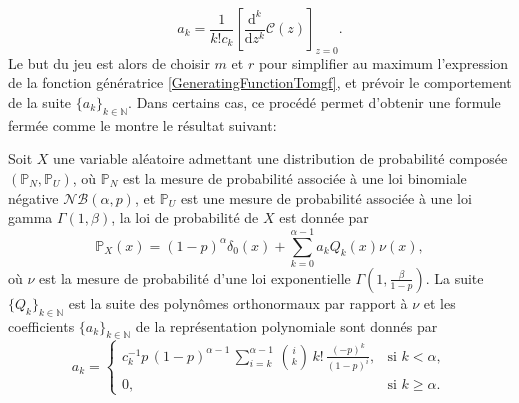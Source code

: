 \begin{equation}\label{CoefficientRepresentationGeneratingFunction}
a_{k}=\frac{1}{k!c_{k}}\left[\frac{\text{d}^{k}}{\text{d}z^{k}}\mathcal{C}(z)\right]_{z=0}.
\end{equation}
Le but du jeu est alors de choisir $m$ et $r$ pour simplifier au maximum l\rq{}expression de la fonction génératrice \eqref{GeneratingFunctionTomgf}, et prévoir le comportement de la suite $\{a_{k}\}_{k\in\mathbb{N}}$. Dans certains cas, ce procédé permet d\rq{}obtenir une formule fermée comme le montre le résultat suivant:
\begin{Prop}
Soit $X$ une variable aléatoire admettant une distribution de probabilité composée $(\mathbb{P}_{N},\mathbb{P}_{U})$, où $\mathbb{P}_{N}$ est la mesure de probabilité associée à une loi binomiale négative $\mathcal{NB}(\alpha,p)$, et $\mathbb{P}_{U}$ est une mesure de probabilité associée à une loi gamma $\Gamma(1,\beta)$, la loi de probabilité de $X$ est donnée par
\begin{equation*}\label{DensityNegativeBinomialCompoundExponential}
\mathbb{P}_{X}(x)=(1-p)^{\alpha}\delta_{0}(x)+\sum_{k=0}^{\alpha-1}a_{k}Q_{k}(x)\nu(x),
\end{equation*}
où $\nu$ est la mesure de probabilité d\rq{}une loi exponentielle $\Gamma\left(1,\frac{\beta}{1-p}\right)$. La suite $\{Q_{k}\}_{k\in\mathbb{N}}$ est la suite des polynômes orthonormaux par rapport à $\nu$ et les coefficients $\{a_{k}\}_{k\in\mathbb{N}}$ de la représentation polynomiale sont donnés par 
\[
a_{k} =
  \begin{cases}
   c_{k}^{-1}p\,(1-p)^{\alpha-1}\,\sum_{i=k}^{\alpha-1}\,\binom{i}{k}\,k!\,\frac{(-p)^{k}}{(1-p)^{i}}, & \text{si } k<\alpha,\\
   0,      & \text{si } k\geq\alpha.
  \end{cases} 
\]
\end{Prop}
